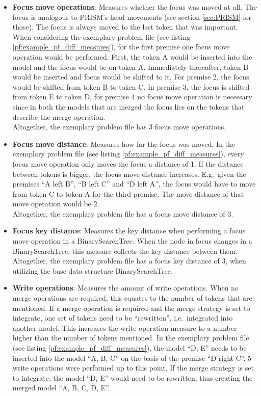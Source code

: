 \documentclass[hidelinks]{scrartcl}
\begin{document}
\begin{itemize}
	\item \textbf{Focus move operations}: Measures whether the focus was moved at all. The focus is 		analogous to PRISM's head movements (see section \ref{sec:PRISM} for those). The focus is always 		moved to the last token that was important. When considering the exemplary problem file (see listing \ref{pf:example_pf_diff_measures}), for the first premise one focus move operation would be performed. First, the token A would be inserted into the model and the focus would be on token A. Immediately thereafter, token B would be inserted and focus would be shifted to it. For premise 2, the focus would be shifted from token B to token C. In premise 3, the focus is shifted from token E to token D, for premise 4 no focus move operation is necessary since in both the models that are merged the focus lies on the tokens that describe the merge operation.\\
	Altogether, the exemplary problem file has 3 focus move operations.
	\item \textbf{Focus move distance}: Measures how far the focus was moved. In the exemplary problem file (see listing \ref{pf:example_pf_diff_measures}), every focus move operation only moves the focus a distance of 1. If the distance between tokens is bigger, the focus move distance increases. E.g.\ given the premises ``A left B'', ``B left C'' and ``D left A'', the focus would have to move from token C to token A for the third premise. The move distance of that move operation would be 2.\\
	Altogether, the exemplary problem file has a focus move distance of 3.
	\item \textbf{Focus key distance}: Measures the key distance when performing a focus move operation in a BinarySearchTree. When the node in focus changes in a BinarySearchTree, this measure collects the key distance between them. \\
	Altogether, the exemplary problem file has a focus key distance of 3, when utilizing the base data structure BinarySearchTree.
	\item \textbf{Write operations}: Measures the amount of write operations. When no merge operations are required, this equates to the number of tokens that are mentioned. If a merge operation is required and the merge strategy is set to integrate, one set of tokens need to be ``rewritten'', i.e.\ integrated into another model. This increases the write operation measure to a number higher than the number of tokens mentioned. In the exemplary problem file (see listing \ref{pf:example_pf_diff_measures}), the model ``D, E'' needs to be inserted into the model ``A, B, C'' on the basis of the premise ``D right C''. 5 write operations were performed up to this point. If the merge strategy is set to integrate, the model ``D, E'' would need to be rewritten, thus creating the merged model ``A, B, C, D, E''.\\

\end{itemize}
\end{document}
